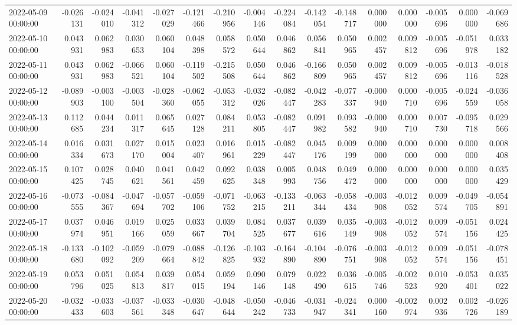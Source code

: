 \begin{tabular}{lrrrrrrrrrrrrrrr}
2022-05-09 00:00:00 & -0.026131 & -0.024010 & -0.041312 & -0.027029 & -0.121466 & -0.210956 & -0.004146 & -0.224084 & -0.142054 & -0.148717 & 0.000000 & 0.000000 & -0.005696 & 0.000000 & -0.069686 \\
2022-05-10 00:00:00 & 0.043931 & 0.062983 & 0.030653 & 0.060104 & 0.048398 & 0.058572 & 0.050644 & 0.046862 & 0.056841 & 0.050965 & 0.002457 & 0.009812 & -0.005696 & -0.051978 & 0.033182 \\
2022-05-11 00:00:00 & 0.043931 & 0.062983 & -0.066521 & 0.060104 & -0.119502 & -0.215508 & 0.050644 & 0.046862 & -0.166809 & 0.050965 & 0.002457 & 0.009812 & -0.005696 & -0.013116 & -0.018528 \\
2022-05-12 00:00:00 & -0.089903 & -0.003100 & -0.003504 & -0.028360 & -0.062055 & -0.053312 & -0.032026 & -0.082447 & -0.042283 & -0.077337 & -0.000940 & 0.000710 & -0.005696 & -0.024559 & -0.036058 \\
2022-05-13 00:00:00 & 0.112685 & 0.044234 & 0.011317 & 0.065645 & 0.027128 & 0.084211 & 0.053805 & -0.082447 & 0.091982 & 0.093582 & -0.000940 & 0.000710 & 0.007730 & -0.095718 & 0.029566 \\
2022-05-14 00:00:00 & 0.016334 & 0.031673 & 0.027170 & 0.015004 & 0.023407 & 0.016961 & 0.015229 & -0.082447 & 0.045176 & 0.009199 & 0.000000 & 0.000000 & 0.000000 & 0.000000 & 0.008408 \\
2022-05-15 00:00:00 & 0.107425 & 0.028745 & 0.040621 & 0.041561 & 0.042459 & 0.092625 & 0.038348 & 0.005993 & 0.048756 & 0.049472 & 0.000000 & 0.000000 & 0.000000 & 0.000000 & 0.035429 \\
2022-05-16 00:00:00 & -0.073555 & -0.084367 & -0.047694 & -0.057702 & -0.059106 & -0.071752 & -0.063215 & -0.133211 & -0.063344 & -0.058434 & -0.003908 & -0.012052 & 0.009574 & -0.049705 & -0.054891 \\
2022-05-17 00:00:00 & 0.037974 & 0.046951 & 0.019166 & 0.025059 & 0.033667 & 0.039704 & 0.084525 & 0.037677 & 0.039616 & 0.035149 & -0.003908 & -0.012052 & 0.009574 & -0.051156 & 0.024425 \\
2022-05-18 00:00:00 & -0.133680 & -0.102092 & -0.059209 & -0.079664 & -0.088842 & -0.126825 & -0.103932 & -0.164890 & -0.104890 & -0.076751 & -0.003908 & -0.012052 & 0.009574 & -0.051156 & -0.078451 \\
2022-05-19 00:00:00 & 0.053796 & 0.051025 & 0.054813 & 0.039817 & 0.054015 & 0.059194 & 0.090146 & 0.079148 & 0.022490 & 0.036615 & -0.005746 & -0.002523 & 0.010920 & -0.053401 & 0.035022 \\
2022-05-20 00:00:00 & -0.032433 & -0.033603 & -0.037561 & -0.033348 & -0.030647 & -0.048644 & -0.050242 & -0.046733 & -0.031947 & -0.024341 & 0.000160 & -0.002974 & 0.002936 & 0.002726 & -0.026189 \\

\end{tabular}
